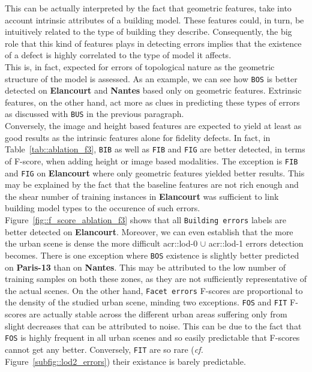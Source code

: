         This can be actually interpreted by the fact that geometric features, take into account intrinsic attributes of a building model.
        These features could, in turn, be intuitively related to the type of building they describe.
        Consequently, the big role that this kind of features plays in detecting errors implies that the existence of a defect is highly correlated to the type of model it affects.\\
        This is, in fact, expected for errors of topological nature as the geometric structure of the model is assessed.
        As an example, we can see how \texttt{BOS} is better detected on \textbf{Elancourt} and \textbf{Nantes} based only on geometric features.
        Extrinsic features, on the other hand, act more as clues in predicting these types of errors as discussed with \texttt{BUS} in the previous paragraph.\\

        Conversely, the image and height based features are expected to yield at least as good results as the intrinsic features alone for fidelity defects.
        In fact, in Table~\ref{tab::ablation_f3}, \texttt{BIB} as well as \texttt{FIB} and \texttt{FIG} are better detected, in terms of F-score, when adding height or image based modalities.
        The exception is \texttt{FIB} and \texttt{FIG} on \textbf{Elancourt} where only geometric features yielded better results.
        This may be explained by the fact that the baseline features are not rich enough and the shear number of training instances in \textbf{Elancourt} was sufficient to link building model types to the occurence of such errors.\\

        Figure~\ref{fig::f_score_ablation_f3} shows that all \texttt{Building errors} labels are better detected on \textbf{Elancourt}.
        Moreover, we can even establish that the more the urban scene is dense the more difficult \gls{acr::lod}-0 \(\cup\) \gls{acr::lod}-1 errors detection becomes.
        There is one exception where \texttt{BOS} existence is slightly better predicted on \textbf{Paris-13} than on \textbf{Nantes}.
        This may be attributed to the low number of training samples on both these zones, as they are not sufficiently representative of the actual scenes.
        On the other hand, \texttt{Facet errors} F-scores are proportional to the density of the studied urban scene, minding two exceptions.
        \texttt{FOS} and \texttt{FIT} F-scores are actually stable across the different urban areas suffering only from slight decreases that can be attributed to noise.
        This can be due to the fact that \texttt{FOS} is highly frequent in all urban scenes and so easily predictable that F-scores cannot get any better. 
        Conversely, \texttt{FIT} are so rare (\textit{cf.} Figure~\ref{subfig::lod2_errors}) their existance is barely predictable.

